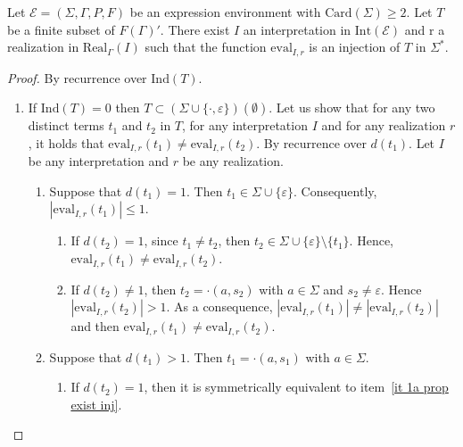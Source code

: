 \documentclass[a4paper]{llncs}
\begin{document}
    \begin{proposition}\label{prop exist inj cas binaire}
    Let $\mathcal{E}=(\Sigma,\Gamma,P,F)$ be an expression environment with $\mathrm{Card}(\Sigma)\geq 2$. Let $T$ be a finite subset of $F(\Gamma)'$.
    There exist $I$ an interpretation in $\mathrm{Int}(\mathcal{E})$ and $\mathrm{r}$ a realization in $\mathrm{Real}_\Gamma(I)$ such that the function $\mathrm{eval}_{I,r}$ is an injection of $T$ in $\Sigma^*$.
  \end{proposition}
  \begin{proof}
    By recurrence over $\mathrm{Ind}(T)$.
    
    \begin{enumerate}
      \item  If $\mathrm{Ind}(T)=0$ then $T\subset(\Sigma\cup\{\cdot,\varepsilon\})(\emptyset)$. Let us show that for any two distinct terms $t_1$ and $t_2$ in $T$, for any interpretation $I$ and for any realization $r$, it holds that $\mathrm{eval}_{I,r}(t_1) \neq \mathrm{eval}_{I,r}(t_2)$.     
    By recurrence over $d(t_1)$. Let $I$ be any interpretation and $r$ be any realization.
    
    \begin{enumerate}
      \item\label{it 1a prop exist inj} Suppose that $d(t_1)=1$. Then $t_1\in\Sigma\cup\{\varepsilon\}$. Consequently, $|\mathrm{eval}_{I,r}(t_1)|\leq 1$.
    
      \begin{enumerate}
        \item If $d(t_2)=1$, since $t_1\neq t_2$, then $t_2\in\Sigma\cup\{\varepsilon\}\setminus\{t_1\}$. Hence, $\mathrm{eval}_{I,r}(t_1)\neq \mathrm{eval}_{I,r}(t_2)$.
    
        \item If $d(t_2)\neq 1$, then $t_2=\cdot(a,s_2)$ with $a\in\Sigma$ and $s_2\neq\varepsilon$. Hence $|\mathrm{eval}_{I,r}(t_2)|>1$. As a consequence,  $|\mathrm{eval}_{I,r}(t_1)|\neq |\mathrm{eval}_{I,r}(t_2)|$ and then $\mathrm{eval}_{I,r}(t_1)\neq \mathrm{eval}_{I,r}(t_2)$.
      \end{enumerate}
    
    \item  Suppose that $d(t_1)>1$. Then $t_1=\cdot(a,s_1)$ with $a\in\Sigma$.
    
      \begin{enumerate}
        \item If $d(t_2)=1$, then it is symmetrically equivalent to item~\ref{it 1a prop exist inj}.
    

\end{enumerate}
\end{enumerate}
\end{enumerate}
\end{proof}
\end{document}
